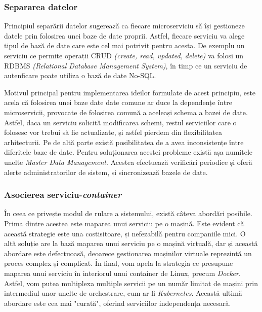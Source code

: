 \subsubsection{Separarea datelor}

Principiul separării datelor sugerează ca fiecare microserviciu să își gestioneze datele prin folosirea unei baze de date proprii. Astfel, fiecare serviciu va alege tipul de bază de date care este cel mai potrivit pentru acesta. De exemplu un serviciu ce permite operații CRUD \textit{(create, read, updated, delete)} va folosi un RDBMS \textit{(Relational Database Management System)}, în timp ce un serviciu de autenficare poate utiliza o bază de date No-SQL. 

Motivul principal pentru implementarea ideilor formulate de acest principiu, este acela că folosirea unei baze date date comune ar duce la dependențe între microservicii, provocate de folosirea comună a aceleași schema a bazei de date. Astfel, daca un serviciu solicită modificarea schemi, restul serviciilor care o folosesc vor trebui să fie actualizate, și astfel pierdem din flexibilitatea arhitecturii. Pe de altă parte există posibilitatea de a avea inconsistențe între diferitele baze de date. Pentru soluționarea acestei probleme există așa numitele unelte \textit{Master Data Management}. Acestea efectuează verificări periodice și oferă alerte administratorilor de sistem, și sincronizează bazele de date.

\subsubsection{Asocierea serviciu-\textit{container}}

În ceea ce privește modul de rulare a sistemului, există câteva abordări posibile. Prima dintre acestea este maparea unui serviciu pe o mașină. Este evident că această strategie este una costisitoare, și nefezabilă pentru companiile mici. O altă soluție are la bază maparea unui serviciu pe o mașină virtuală, dar și această abordare este defectuoasă, deoarece gestionarea mașinilor virtuale reprezintă un proces complex și complicat. În final, vom apela la strategia ce presupune maparea unui serviciu în interiorul unui container de Linux, precum \textit{Docker}. Astfel, vom putea multiplexa multiple servicii pe un număr limitat de mașini prin intermediul unor unelte de orchestrare, cum ar fi \textit{Kubernetes}. Această ultimă abordare este cea mai "curată", oferind serviciilor independența necesară.

